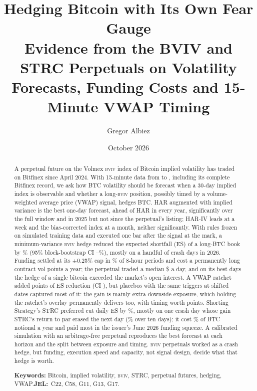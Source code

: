 \documentclass[10pt,a4paper]{article}
\title{\vspace{-0.6em}\textbf{Hedging Bitcoin with Its Own Fear Gauge}\\[2pt]
\large Evidence from the BVIV and STRC Perpetuals on Volatility Forecasts, Funding Costs and 15-Minute VWAP Timing}
\author{Gregor Albiez}
\date{October 2026}
\newcommand{\BVIV}{\textsc{bviv}}
\begin{document}
\maketitle
\vspace{0.4em}

\begin{abstract}
\noindent A perpetual future on the Volmex \BVIV{} index of Bitcoin implied volatility has traded on Bitfinex since April 2024. With 15-minute data from \LiveStart{} to \LiveEnd{}, including its complete Bitfinex record, we ask how BTC volatility should be forecast when a 30-day implied index is observable and whether a long-\BVIV{} position, possibly timed by a volume-weighted average price (VWAP) signal, hedges BTC. HAR augmented with implied variance is the best one-day forecast, ahead of HAR in every year, significantly over the full window and in 2025 but not since the perpetual's listing; HAR-IV leads at a week and the bias-corrected index at a month, neither significantly. With rules frozen on simulated training data and executed one bar after the signal at the mark, a minimum-variance \BVIV{} hedge reduced the expected shortfall (ES) of a long-BTC book by \LiveEsAlways\% (95\% block-bootstrap CI \LiveEsAlwaysLo--\LiveEsAlwaysHi\%), mostly on a handful of crash days in 2026. Funding settled at its $\pm$0.25\% cap in \LiveFundCapShare\% of 8-hour periods and cost a permanently long contract \LiveFundAnnualPts{} vol points a year; the perpetual traded a median \$\LiveMedianUsd{} a day, and on its best days the hedge of a single bitcoin exceeded the market's open interest. A VWAP ratchet added \LiveDRatchetAbs{} points of ES reduction (CI \LiveDRatchetCi), but placebos with the same triggers at shifted dates captured most of it: the gain is mainly extra downside exposure, which holding the ratchet's overlay permanently delivers too, with timing worth \LiveTiming{} points. Shorting Strategy's STRC preferred cut daily ES by \StrcEsAlways\%, mostly on one crash day whose gain STRC's return to par erased the next day (\StrcEsTen\% over ten days); it cost \StrcCostAlways\% of BTC notional a year and paid most in the issuer's June 2026 funding squeeze. A calibrated simulation with an arbitrage-free perpetual reproduces the best forecast at each horizon and the split between exposure and timing. \BVIV{} perpetuals worked as a crash hedge, but funding, execution speed and capacity, not signal design, decide what that hedge is worth.

\medskip\noindent\textbf{Keywords:} Bitcoin, implied volatility, \BVIV{}, STRC, perpetual futures, hedging, VWAP.\quad\textbf{JEL:}~C22, C58, G11, G13, G17.
\end{abstract}
\end{document}
